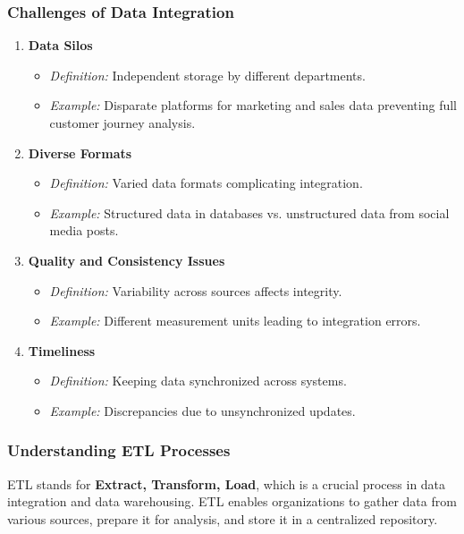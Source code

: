\documentclass[aspectratio=169]{beamer}
\begin{document}
\begin{frame}[fragile]
    \frametitle{Challenges of Data Integration}
    \begin{enumerate}
        \item \textbf{Data Silos}
            \begin{itemize}
                \item \textit{Definition:} Independent storage by different departments.
                \item \textit{Example:} Disparate platforms for marketing and sales data preventing full customer journey analysis.
            \end{itemize}

        \item \textbf{Diverse Formats}
            \begin{itemize}
                \item \textit{Definition:} Varied data formats complicating integration.
                \item \textit{Example:} Structured data in databases vs. unstructured data from social media posts.
            \end{itemize}

        \item \textbf{Quality and Consistency Issues}
            \begin{itemize}
                \item \textit{Definition:} Variability across sources affects integrity.
                \item \textit{Example:} Different measurement units leading to integration errors.
            \end{itemize}

        \item \textbf{Timeliness}
            \begin{itemize}
                \item \textit{Definition:} Keeping data synchronized across systems.
                \item \textit{Example:} Discrepancies due to unsynchronized updates.
            \end{itemize}
    \end{enumerate}
\end{frame}

\begin{frame}[fragile]
    \frametitle{Understanding ETL Processes}
    ETL stands for \textbf{Extract, Transform, Load}, which is a crucial process in data integration and data warehousing. 
    ETL enables organizations to gather data from various sources, prepare it for analysis, and store it in a centralized repository.
\end{frame}
\end{document}
